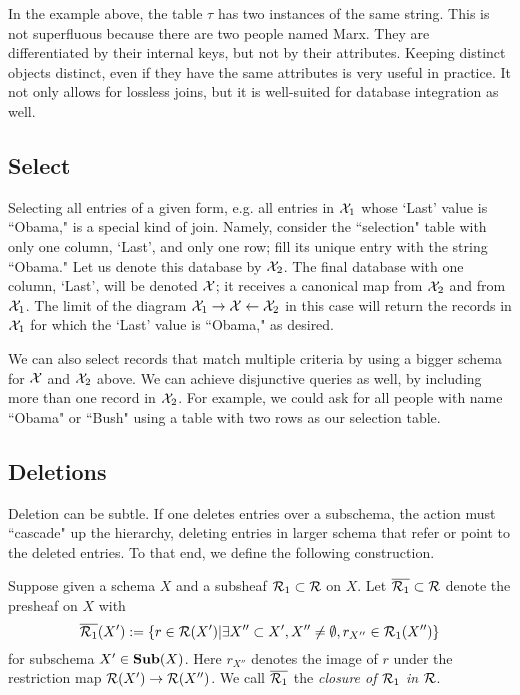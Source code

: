 \documentclass{amsart}
\begin{document}
In the example above, the table $\tau$ has two instances of the same string.  This is not superfluous because there are two people named Marx.  They are differentiated by their internal keys, but not by their attributes.  Keeping distinct objects distinct, even if they have the same attributes is very useful in practice.  It not only allows for lossless joins, but it is well-suited for database integration as well.

\subsection{Select}\label{subsec:select}

Selecting all entries of a given form, e.g. all entries in $\mathcal{X}_1$ whose `Last' value is ``Obama," is a special kind of join.  Namely, consider the ``selection" table with only one column, `Last', and only one row; fill its unique entry with the string ``Obama."  Let us denote this database by $\mathcal{X}_2$.  The final database with one column, `Last', will be denoted $\mathcal{X}$; it receives a canonical map from $\mathcal{X}_2$ and from $\mathcal{X}_1$.  The limit of the diagram $\mathcal{X}_1\rightarrow\mathcal{X}\leftarrow\mathcal{X}_2$ in this case will return the records in $\mathcal{X}_1$ for which the `Last' value is ``Obama," as desired.

We can also select records that match multiple criteria by using a bigger schema for $\mathcal{X}$ and $\mathcal{X}_2$ above.  We can achieve disjunctive queries as well, by including more than one record in $\mathcal{X}_2$.  For example, we could ask for all people with name ``Obama" or ``Bush" using a table with two rows as our selection table. 

\subsection{Deletions}\label{subsec:delete}

Deletion can be subtle.  If one deletes entries over a subschema, the action must ``cascade" up the hierarchy, deleting entries in larger schema that refer or point to the deleted entries.  To that end, we define the following construction.  

\begin{definition}

Suppose given a schema $X$ and a subsheaf $\mathcal{R}_1\subset\mathcal{R}$ on $X$.  Let $\overline{\mathcal{R}_1}\subset\mathcal{R}$ denote the presheaf on $X$ with $$\overline{\mathcal{R}_1}(X'):=\{r\in\mathcal{R}(X')|\exists X''\subset X', X''\neq\emptyset, r_{X''}\in\mathcal{R}_1(X'')\}$$ for subschema $X'\in{\bf Sub}(X)$.  Here $r_{X''}$ denotes the image of $r$ under the restriction map $\mathcal{R}(X')\rightarrow\mathcal{R}(X'')$.  We call $\overline{\mathcal{R}_1}$ the {\em closure of $\mathcal{R}_1$ in $\mathcal{R}$}.

\end{definition}
\end{document}
